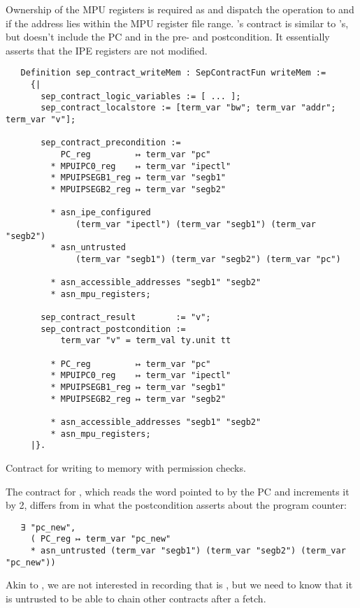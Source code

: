 Ownership of the MPU registers is required as  and  dispatch the operation to  and  if the address lies within the MPU register file range. 's contract is similar to 's, but doesn't include the PC and  in the pre- and postcondition. It essentially asserts that the IPE registers are not modified.

\begin{listing}[h]
  \begin{verbatim}
   Definition sep_contract_writeMem : SepContractFun writeMem :=
     {|
       sep_contract_logic_variables := [ ... ];
       sep_contract_localstore := [term_var "bw"; term_var "addr"; term_var "v"];

       sep_contract_precondition :=
           PC_reg         ↦ term_var "pc"
         * MPUIPC0_reg    ↦ term_var "ipectl"
         * MPUIPSEGB1_reg ↦ term_var "segb1"
         * MPUIPSEGB2_reg ↦ term_var "segb2"

         * asn_ipe_configured
              (term_var "ipectl") (term_var "segb1") (term_var "segb2")
         * asn_untrusted
              (term_var "segb1") (term_var "segb2") (term_var "pc")

         * asn_accessible_addresses "segb1" "segb2"
         * asn_mpu_registers;

       sep_contract_result        := "v";
       sep_contract_postcondition :=
           term_var "v" = term_val ty.unit tt

         * PC_reg         ↦ term_var "pc"
         * MPUIPC0_reg    ↦ term_var "ipectl"
         * MPUIPSEGB1_reg ↦ term_var "segb1"
         * MPUIPSEGB2_reg ↦ term_var "segb2"

         * asn_accessible_addresses "segb1" "segb2"
         * asn_mpu_registers;
     |}.
  \end{verbatim}
  \caption{Contract for writing to memory with permission checks.}
  \label{lst:writeMem}
\end{listing}

\pagebreak

The contract for , which reads the word pointed to by the PC and increments it by 2, differs from  in what the postcondition asserts about the program counter:
\begin{verbatim}
   ∃ "pc_new",
     ( PC_reg ↦ term_var "pc_new"
     * asn_untrusted (term_var "segb1") (term_var "segb2") (term_var "pc_new"))
\end{verbatim}
Akin to , we are not interested in recording that  is , but we need to know that it is untrusted to be able to chain other contracts after a fetch.

